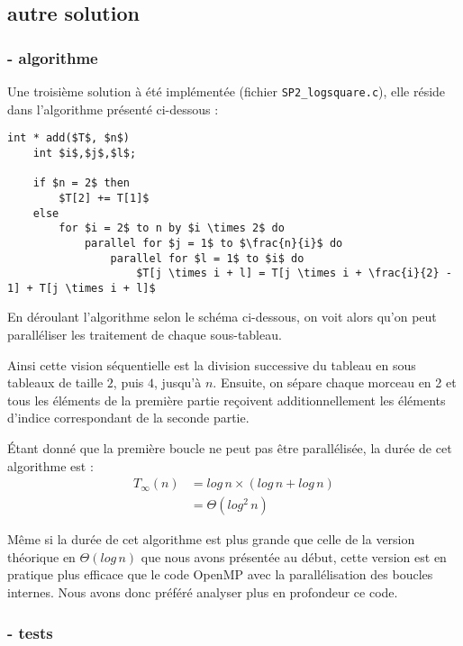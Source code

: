 \subsection*{autre solution}
\subsubsection*{- algorithme}
Une troisième solution à été implémentée (fichier \verb+SP2_logsquare.c+), elle réside dans l'algorithme présenté ci-dessous :

\begin{lstlisting}[mathescape, style=cilk, title=Algorithme ittératif]
int * add($T$, $n$)
    int $i$,$j$,$l$;

    if $n = 2$ then
        $T[2] += T[1]$
    else
        for $i = 2$ to n by $i \times 2$ do
            parallel for $j = 1$ to $\frac{n}{i}$ do
                parallel for $l = 1$ to $i$ do
                    $T[j \times i + l] = T[j \times i + \frac{i}{2} - 1] + T[j \times i + l]$
\end{lstlisting}

En déroulant l'algorithme selon le schéma ci-dessous, on voit alors qu'on peut paralléliser les traitement de chaque sous-tableau.



Ainsi cette vision séquentielle est la division successive du tableau en sous tableaux de taille $2$, puis $4$, jusqu'à $n$. Ensuite, on sépare chaque morceau en 2 et tous les éléments de la première partie reçoivent additionnellement les éléments d'indice correspondant de la seconde partie.

Étant donné que la première boucle ne peut pas être parallélisée, la durée de cet algorithme est :
\begin{equation} \label{eq3}
\begin{split}
T_\infty(n) & = log \, n \times (log \, n + log \, n)\\ 
 & = \Theta (log^2 \, n)
\end{split}
\end{equation}

Même si la durée de cet algorithme est plus grande que celle de la version théorique en $\Theta (log \, n)$ que nous avons présentée au début, cette version est en pratique plus efficace que le code OpenMP avec la parallélisation des boucles internes. Nous avons donc préféré analyser plus en profondeur ce code.

\subsubsection*{- tests}

